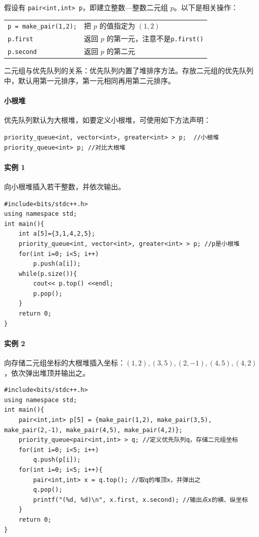 \documentclass[UTF8]{ctexart}
\begin{document}
假设有 \verb!pair<int,int> p!，即建立整数—整数二元组 $p$。以下是相关操作：
\begin{table}[H]
  \centering
  \begin{tabular}{ll}
    \verb!p = make_pair(1,2);! & 把 $p$ 的值指定为 $(1,2)$ \\
    \verb!p.first! & 返回 $p$ 的第一元，注意不是\verb!p.first()!  \\
    \verb!p.second! & 返回 $p$ 的第二元 \\ 
  \end{tabular}
\end{table}

二元组与优先队列的关系：优先队列内置了堆排序方法。存放二元组的优先队列中，默认用第一元排序，第一元相同再用第二元排序。

\paragraph{小根堆} 优先队列默认为大根堆，如要定义小根堆，可使用如下方法声明：
\begin{lstlisting}[numbers=none]
priority_queue<int, vector<int>, greater<int> > p;  //小根堆
priority_queue<int> p; //对比大根堆
\end{lstlisting}

\paragraph{实例 1} 向小根堆插入若干整数，并依次输出。
\begin{lstlisting}
#include<bits/stdc++.h>
using namespace std;
int main(){
	int a[5]={3,1,4,2,5};
	priority_queue<int, vector<int>, greater<int> > p; //p是小根堆
	for(int i=0; i<5; i++)
		p.push(a[i]);
	while(p.size()){
		cout<< p.top() <<endl;
		p.pop();
	}
	return 0;
}
\end{lstlisting}

\paragraph{实例 2} 向存储二元组坐标的大根堆插入坐标：$(1,2),(3,5),(2,-1),(4,5),(4,2)$，依次弹出堆顶并输出之。
\begin{lstlisting}
#include<bits/stdc++.h>
using namespace std;
int main(){
	pair<int,int> p[5] = {make_pair(1,2), make_pair(3,5), make_pair(2,-1), make_pair(4,5), make_pair(4,2)};
	priority_queue<pair<int,int> > q; //定义优先队列q，存储二元组坐标
	for(int i=0; i<5; i++)
		q.push(p[i]);
	for(int i=0; i<5; i++){
		pair<int,int> x = q.top(); //取q的堆顶x，并弹出之
		q.pop();
		printf("(%d, %d)\n", x.first, x.second); //输出点x的横、纵坐标
	}
	return 0;
}
\end{lstlisting}
\end{document}
